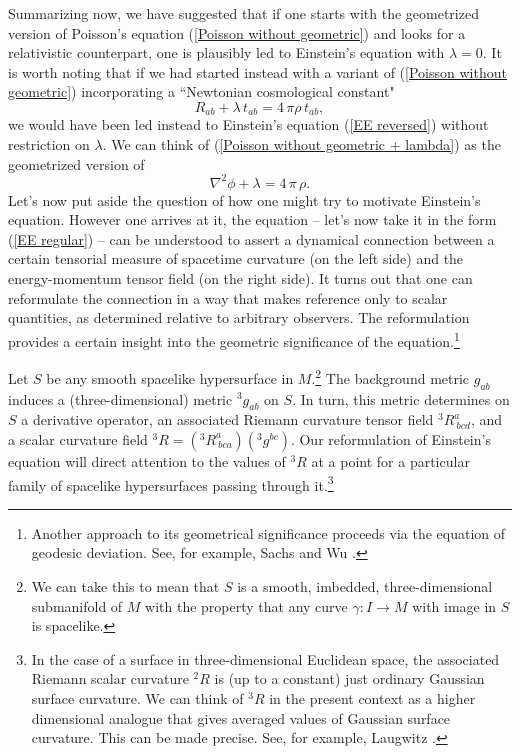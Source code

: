 \documentclass [12] {article}
\theoremstyle{plain}
\numberwithin{figure}{subsection}
\numberwithin{proposition}{subsection}
\begin{document}
Summarizing now, we have suggested that if one starts with the geometrized version of Poisson's equation (\ref{Poisson without geometric}) and looks for a relativistic counterpart, one is plausibly led to Einstein's equation with $\lambda = 0$. It is worth noting that if we had started instead with a variant of (\ref{Poisson without geometric}) incorporating a ``Newtonian cosmological constant"
%
\begin{equation} \label{Poisson without geometric + lambda}
R_{ab} + \lambda \, t_{ab} = 4 \, \pi  \rho \,  t_{ab},
\end{equation}
%
we would have been led instead to Einstein's equation (\ref{EE reversed}) without restriction on $\lambda$.  We can think of (\ref{Poisson without geometric + lambda}) as the geometrized version of 
%
\begin{equation} \label{Poisson without}
\nabla^2  \phi  + \lambda = 4 \, \pi \, \rho.
\end{equation}
\indent Let's now put aside the question of how one might try to motivate Einstein's equation. However one arrives at it, the equation -- let's now take it in the form (\ref{EE regular}) -- can be understood to assert a dynamical connection between a certain tensorial measure of spacetime curvature (on the left side) and the energy-momentum tensor field (on the right  side). It turns out that one can reformulate the connection in a way that makes reference only to scalar quantities, as determined relative to arbitrary observers.  The reformulation provides a certain insight into the geometric significance of the equation.\footnote{Another approach to its geometrical significance proceeds via the equation of geodesic deviation.  See, for example, Sachs and Wu .}
  
Let $S$ be any smooth spacelike hypersurface in $M$.\footnote{We can take this to mean that $S$ is a smooth, imbedded, three-dimensional submanifold of $M$ with the property that any curve $\gamma:I \rightarrow M$ with image in $S$ is spacelike.}  The background metric  $g_{ab}$ induces a (three-dimensional) metric ${}^3g_{ab}$ on $S$.  In turn, this metric determines on $S$ a derivative operator, an associated Riemann curvature tensor field ${}^3R^a_{\ bcd}$, and a scalar curvature field ${}^3R =({}^3R^a_{\ bca})({}^3g^{bc})$.  Our reformulation  of Einstein's equation will direct attention to the values of ${}^3R$ at a point for a particular family of spacelike hypersurfaces passing through it.\footnote{In the case of a surface in three-dimensional Euclidean space, the associated Riemann scalar curvature ${}^2R$ is (up to a constant) just ordinary Gaussian surface curvature. We can think of ${}^3R$ in the present context as a higher dimensional analogue that  gives averaged values of Gaussian surface curvature. This can be made precise. See, for example, Laugwitz .}  
\end{document}
